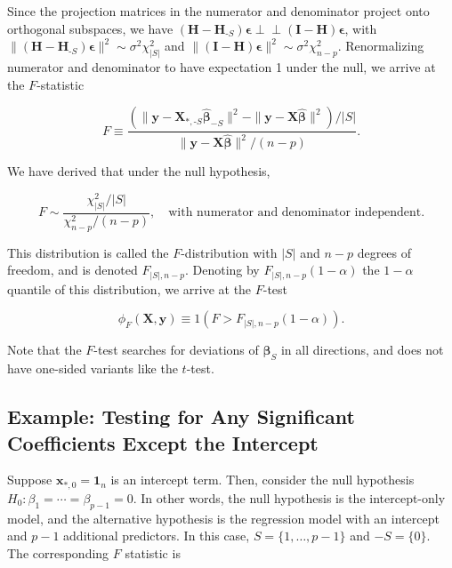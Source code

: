 \documentclass[
  11pt,
  letterpaper,
  oneside]{book}
\theoremstyle{definition}
\theoremstyle{plain}
\theoremstyle{plain}
\theoremstyle{plain}
\theoremstyle{remark}
\begin{document}
Since the projection matrices in the numerator and denominator project
onto orthogonal subspaces, we have
\((\boldsymbol{H} - \boldsymbol{H}_{\text{-}S}) \boldsymbol{\epsilon} \perp\!\!\!\perp (\boldsymbol{I} - \boldsymbol{H}) \boldsymbol{\epsilon}\),
with
\(\|(\boldsymbol{H} - \boldsymbol{H}_{\text{-}S}) \boldsymbol{\epsilon}\|^2 \sim \sigma^2 \chi^2_{|S|}\)
and
\(\|(\boldsymbol{I} - \boldsymbol{H}) \boldsymbol{\epsilon}\|^2 \sim \sigma^2 \chi^2_{n-p}\).
Renormalizing numerator and denominator to have expectation 1 under the
null, we arrive at the \(F\)-statistic

\[
F \equiv \frac{(\|\boldsymbol{y} - \boldsymbol{X}_{*, \text{-}S} \boldsymbol{\widehat{\beta}}_{-S}\|^2 - \|\boldsymbol{y} - \boldsymbol{X} \boldsymbol{\widehat{\beta}}\|^2)/|S|}{\|\boldsymbol{y} - \boldsymbol{X} \boldsymbol{\widehat{\beta}}\|^2/(n-p)}.
\]

We have derived that under the null hypothesis,

\[
F \sim \frac{\chi^2_{|S|}/|S|}{\chi^2_{n-p}/(n-p)}, \quad \text{with numerator and denominator independent.}
\]

This distribution is called the \(F\)-distribution with \(|S|\) and
\(n-p\) degrees of freedom, and is denoted \(F_{|S|, n-p}\). Denoting by
\(F_{|S|, n-p}(1-\alpha)\) the \(1-\alpha\) quantile of this
distribution, we arrive at the \(F\)-test

\[
\phi_F(\boldsymbol{X}, \boldsymbol{y}) \equiv 1(F > F_{|S|, n-p}(1-\alpha)).
\]

Note that the \(F\)-test searches for deviations of
\(\boldsymbol{\beta}_{S}\) in all directions, and does not have
one-sided variants like the \(t\)-test.

\hypertarget{example-testing-for-any-significant-coefficients-except-the-intercept}{%
\subsection{Example: Testing for Any Significant Coefficients Except the
Intercept}\label{example-testing-for-any-significant-coefficients-except-the-intercept}}

Suppose \(\boldsymbol{x}_{*,0} = \boldsymbol{1}_n\) is an intercept
term. Then, consider the null hypothesis
\(H_0: \beta_1 = \cdots = \beta_{p-1} = 0\). In other words, the null
hypothesis is the intercept-only model, and the alternative hypothesis
is the regression model with an intercept and \(p-1\) additional
predictors. In this case, \(S = \{1, \dots, p-1\}\) and \(-S = \{0\}\).
The corresponding \(F\) statistic is
\end{document}
